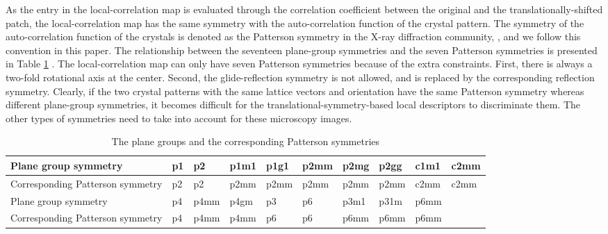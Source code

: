 \documentclass[twocolumn,amsmath, floatfix]{revtex4}
\begin{document}
As the entry in the local-correlation map is evaluated through the correlation coefficient between the original and the translationally-shifted patch, the local-correlation map has the same symmetry with the auto-correlation function of the crystal pattern. The symmetry of the auto-correlation function of the crystals is denoted as the Patterson symmetry in the X-ray diffraction community, \cite{ITA2002}, and we follow this convention in this paper. The relationship between the seventeen plane-group symmetries and the seven Patterson symmetries is presented in Table \ref{Patterson_symmetries} \cite{ITA2002}. The local-correlation map can only have seven Patterson symmetries because of the extra constraints. First, there is always a two-fold rotational axis at the center. Second, the glide-reflection symmetry is not allowed, and is replaced by the corresponding reflection symmetry. Clearly, if the two crystal patterns with the same lattice vectors and orientation have the same Patterson symmetry whereas different plane-group symmetries, it becomes difficult for the translational-symmetry-based local descriptors to discriminate them.  The other types of symmetries need to take into account for these microscopy images. 

\begin{table}[ht]
\centering
\caption{The plane groups and the corresponding Patterson symmetries \cite{ITA2002}}
\label{Patterson_symmetries}
\begin{tabular}{ |p{6cm}|p{1cm}|p{1cm}|p{1cm}|p{1cm}|p{1cm}|p{1cm}|p{1cm}|p{1cm}|p{1cm}| }
\hline
 Plane group symmetry & p1 & p2 & p1m1 & p1g1 & p2mm & p2mg & p2gg & c1m1& c2mm  \\ 
\hline
 Corresponding Patterson symmetry & p2 & p2 & p2mm & p2mm  & p2mm & p2mm & p2mm & c2mm & c2mm \\
 \hline
 Plane group symmetry & p4& p4mm & p4gm & p3 & p6 & p3m1 & p31m  & p6mm &  \\
 \hline
 Corresponding Patterson symmetry & p4 & p4mm & p4mm & p6 & p6 & p6mm & p6mm  & p6mm &  \\
 \hline
 \end{tabular}
\end{table}
\end{document}
